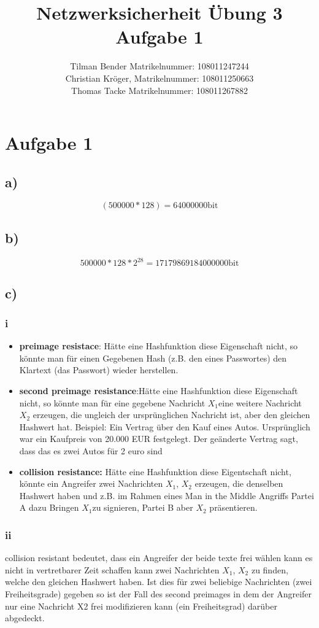 \documentclass[10pt,a4paper]{article}
\author{Tilman Bender   Matrikelnummer: 108011247244\\Christian Kröger,   Matrikelnummer: 108011250663\\Thomas Tacke  Matrikelnummer: 108011267882}
\title{Netzwerksicherheit Übung 3 Aufgabe 1}
\begin{document}
\maketitle

\section*{Aufgabe 1}
\subsection*{a)}
	\begin{equation}
		(500000 * 128) = 64000000 \text{bit}
	\end{equation}
\subsection*{b)}
	\begin{equation}
		500000 * 128 * 2^{28} = 17179869184000000 \text{bit}
	\end{equation}
\subsection*{c)}
\subsubsection*{i}
\begin{itemize}
\item \textbf{preimage resistace}: Hätte eine Hashfunktion diese Eigenschaft nicht, so könnte man für einen Gegebenen Hash (z.B. den eines Passwortes) den Klartext (das Passwort) wieder herstellen.
\item \textbf{second preimage resistance}:Hätte eine Hashfunktion diese Eigenschaft nicht,  so könnte man für eine gegebene Nachricht $X_{1} $eine weitere Nachricht  $X_{2}$ erzeugen, die ungleich der ursprünglichen Nachricht ist, aber den gleichen Hashwert hat. Beispiel: Ein Vertrag über den Kauf eines Autos. Ursprünglich war ein Kaufpreis von 20.000 EUR festgelegt. Der geänderte Vertrag sagt, dass das es zwei Autos für 2 euro sind

\item \textbf{collision resistance:} Hätte eine Hashfunktion diese Eigentschaft nicht, könnte ein Angreifer zwei Nachrichten $X_{1}$, $X_{2}$ erzeugen, die denselben Hashwert haben und  z.B. im Rahmen eines Man in the Middle Angriffs Partei A dazu Bringen $X_{1}$zu signieren, Partei B aber $X_{2}$ präsentieren.
\end{itemize}

\subsubsection*{ii}
collision resistant bedeutet, dass ein Angreifer der beide texte frei wählen kann es nicht in vertretbarer Zeit schaffen kann zwei Nachrichten $X_{1}$, $X_{2}$ zu finden, welche den gleichen Hashwert haben. Ist dies für zwei beliebige Nachrichten (zwei Freiheitsgrade) gegeben so ist der Fall des second preimages in dem der Angreifer nur eine Nachricht X2 frei modifizieren kann  (ein Freiheitsgrad) darüber abgedeckt.
\end{document}
